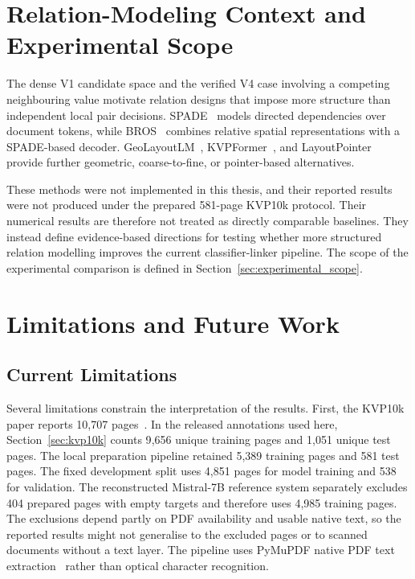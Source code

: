 \section{Relation-Modeling Context and Experimental Scope}
\label{sec:relation_context}

The dense V1 candidate space and the verified V4 case involving a competing
neighbouring value motivate relation designs that impose more structure than
independent local pair decisions. SPADE~\cite{spade} models directed dependencies over document
tokens, while BROS~\cite{bros} combines relative spatial representations with
a SPADE-based decoder. GeoLayoutLM~\cite{geolayoutlm},
KVPFormer~\cite{kvpformer}, and LayoutPointer~\cite{layoutpointer} provide
further geometric, coarse-to-fine, or pointer-based alternatives.

These methods were not implemented in this thesis, and their reported results
were not produced under the prepared 581-page KVP10k protocol. Their numerical
results are therefore not treated as directly comparable baselines. They
instead define evidence-based directions for testing whether more structured
relation modelling improves the current classifier-linker pipeline. The scope
of the experimental comparison is defined in
Section~\ref{sec:experimental_scope}.

\section{Limitations and Future Work}
\label{sec:limitations}

\subsection{Current Limitations}

Several limitations constrain the interpretation of the results. First, the
KVP10k paper reports 10{,}707 pages~\cite{kvp10k}. In the released annotations
used here, Section~\ref{sec:kvp10k} counts 9{,}656 unique training pages and
1{,}051 unique test pages. The local preparation pipeline retained 5{,}389
training pages and 581 test pages. The fixed development split uses 4{,}851
pages for model training and 538 for validation. The reconstructed Mistral-7B reference
system separately excludes 404 prepared pages with empty targets and therefore
uses 4{,}985 training pages. The exclusions depend partly on PDF availability
and usable native text, so the reported results might not generalise to the
excluded pages or to scanned documents without a text layer. The pipeline uses
PyMuPDF native PDF text extraction~\cite{pymupdf} rather than optical character
recognition.

